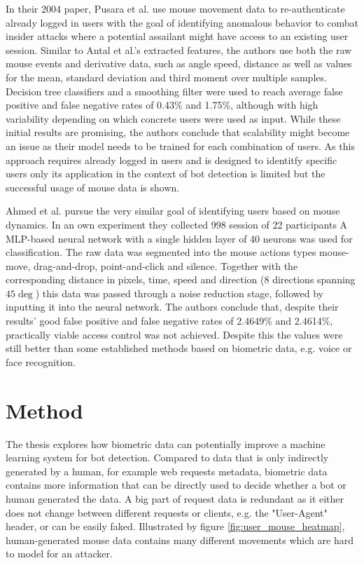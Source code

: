 \documentclass[
    fontsize=12pt,
    headings=small,
    parskip=half,           %
    bibliography=totoc,
    numbers=noenddot,       %
    open=any,               %
    final,                   %
    table
]{scrreprt}
\begin{document}
In their 2004 paper, Pusara et al. \cite{10.1145/1029208.1029210} use mouse movement data to re-authenticate already logged in users with the goal of identifying anomalous behavior to combat insider attacks where a potential assailant might have access to an existing user session. Similar to Antal et al.'s \cite{https://doi.org/10.1049/iet-bmt.2018.5126} extracted features, the authors use both the raw mouse events and derivative data, such as angle speed, distance as well as values for the mean, standard deviation and third moment over multiple samples. Decision tree classifiers and a smoothing filter were used to reach average false positive and false negative rates of 0.43\% and 1.75\%, although with high variability depending on which concrete users were used as input. While these initial results are promising, the authors conclude that scalability might become an issue as their model needs to be trained for each combination of users. As this approach requires already logged in users and is designed to identitfy specific users only its application in the context of bot detection is limited but the successful usage of mouse data is shown.

Ahmed et al. pursue the very similar goal of identifying users based on mouse dynamics. In an own experiment they collected 998 session of 22 participants
A MLP-based neural network with a single hidden layer of 40 neurons was used for classification. The raw data was segmented into the mouse actions types mouse-move, drag-and-drop, point-and-click and silence. Together with the corresponding distance in pixels, time, speed and direction (8 directions spanning $45\deg$) this data was passed through a noise reduction stage, followed by inputting it into the neural network. The authors conclude that, despite their results' good false positive and false negative rates of 2.4649\% and 2.4614\%, practically viable access control was not achieved. Despite this the values were still better than some established methods based on biometric data, e.g. voice or face recognition.


\chapter{Method}

The thesis explores how biometric data can potentially improve a machine learning system for bot detection. Compared to data that is only indirectly generated by a human, for example web requests metadata, biometric data contains more information that can be directly used to decide whether a bot or human generated the data. A big part of request data is redundant as it either does not change between different requests or clients, e.g. the "User-Agent" header, or can be easily faked. Illustrated by figure \ref{fig:user_mouse_heatmap}, human-generated mouse data contains many different movements which are hard to model for an attacker.
\end{document}

